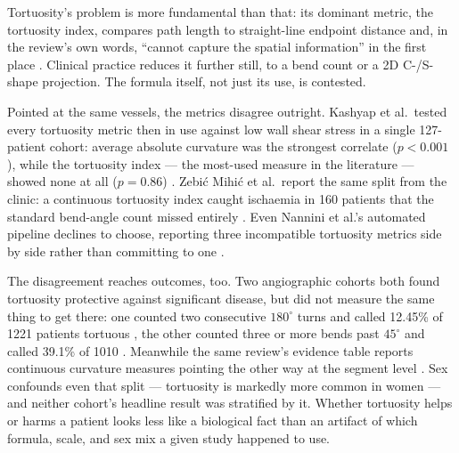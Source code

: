 Tortuosity's problem is more fundamental than that: its dominant metric, the tortuosity index, compares path
length to straight-line endpoint distance and, in the review's own words, ``cannot capture the
spatial information'' in the first place \cite{shen2026geometry}.
Clinical practice reduces it further still, to a bend count or a 2D C-/S-shape projection.
The formula itself, not just its use, is contested.

Pointed at the same vessels, the metrics disagree outright.
Kashyap et al.\ tested every tortuosity metric then in use against low wall shear stress in a single
127-patient cohort: average absolute curvature was the strongest correlate ($p<0.001$), while the
tortuosity index --- the most-used measure in the literature --- showed none at all ($p=0.86$)
\cite{kashyap2022tortuosity}.
Zebi\'c Mihi\'c et al.\ report the same split from the clinic: a continuous tortuosity index caught
ischaemia in 160 patients that the standard bend-angle count missed entirely
\cite{zebicmihic2024index}.
Even Nannini et al.'s automated pipeline declines to choose, reporting three incompatible tortuosity
metrics side by side rather than committing to one \cite{nannini2024characterization,
zebicmihic2023tortuosity}.

The disagreement reaches outcomes, too.
Two angiographic cohorts both found tortuosity protective against significant disease, but did not
measure the same thing to get there: one counted two consecutive $180^\circ$ turns and called
12.45\% of 1221 patients tortuous \cite{groves2009tortuosity}, the other counted three or more bends
past $45^\circ$ and called 39.1\% of 1010 \cite{li2011tortuosity}.
Meanwhile the same review's evidence table reports continuous curvature measures pointing the other
way at the segment level \cite{shen2026geometry}.
Sex confounds even that split --- tortuosity is markedly more common in women
\cite{li2011tortuosity} --- and neither cohort's headline result was stratified by it.
Whether tortuosity helps or harms a patient looks less like a biological fact than an artifact of
which formula, scale, and sex mix a given study happened to use.

